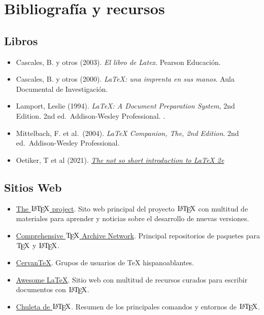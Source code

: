 \documentclass[
  a4paper,
]{scrreport}
\providecommand{\tightlist}{%
  \setlength{\itemsep}{0pt}\setlength{\parskip}{0pt}}\usepackage{longtable,booktabs,array}
\begin{document}

\hypertarget{bibliografuxeda-y-recursos}{%
\chapter*{Bibliografía y recursos}\label{bibliografuxeda-y-recursos}}


\hypertarget{libros}{%
\section*{Libros}\label{libros}}


\begin{itemize}
\tightlist
\item
  Cascales, B. y otros (2003). \emph{El libro de Latex}. Pearson
  Educación.
\item
  Cascales, B. y otros (2000). \emph{LaTeX: una imprenta en sus manos}.
  Aula Documental de Investigación.
\item
  Lamport, Leslie (1994). \emph{LaTeX: A Document Preparation System},
  2nd Edition. 2nd ed.~Addison-Wesley Professional. .
\item
  Mittelbach, F. et al.~(2004). \emph{LaTeX Companion, The, 2nd
  Edition}. 2nd ed.~Addison-Wesley Professional.
\item
  Oetiker, T et al (2021).
  \href{https://tobi.oetiker.ch/lshort/lshort.pdf}{\emph{The not so
  short introduction to LaTeX 2e}}
\end{itemize}

\hypertarget{sitios-web}{%
\section*{Sitios Web}\label{sitios-web}}


\begin{itemize}
\tightlist
\item
  \href{https://www.latex-project.org/}{The \(\text{\LaTeX}\) project}.
  Sito web principal del proyecto \(\text{\LaTeX}\) con multitud de
  materiales para aprender y noticias sobre el desarrollo de nuevas
  versiones.
\item
  \href{https://ctan.org/}{Comprehensive \(\text{\TeX}\) Archive
  Network}. Principal repositorios de paquetes para \(\text{\TeX}\) y
  \(\text{\LaTeX}\).
\item
  \href{www.cervantex.es/}{CervanTeX}. Grupos de usuarios de TeX
  hispanoablantes.
\item
  \href{https://project-awesome.org/egeerardyn/awesome-LaTeX}{Awesome
  LaTeX}. Sitio web con multitud de recursos curados para escribir
  documentos con \(\text{\LaTeX}\).
\item
  \href{chulatex.pdf}{Chuleta de \(\text{\LaTeX}\)}. Resumen de los
  principales comandos y entornos de \(\text{\LaTeX}\).
\end{itemize}
\end{document}

